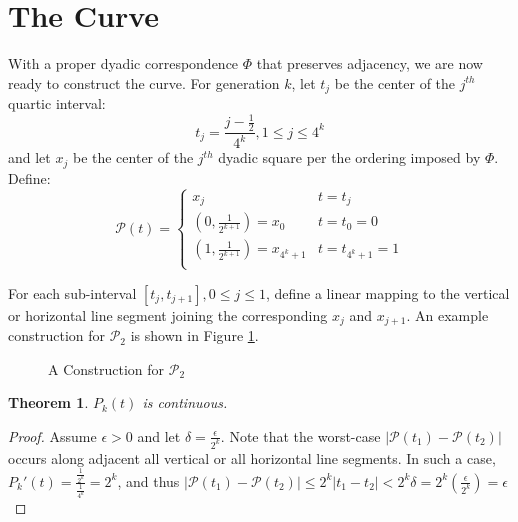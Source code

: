 \documentclass[letterpaper,12pt,fleqn,reqno]{amsart}
\newcommand{\pc}{\mathcal{P}}
\newcommand{\abs}[1]{\left\lvert#1\right\rvert}
\theoremstyle{plain}
\newtheorem{thm}{Theorem}[section]
\begin{document}
\section{The Curve}

With a proper dyadic correspondence $\Phi$ that preserves adjacency, we are now
ready to construct the curve. For generation $k$, let $t_j$ be the center of
the $j^{th}$ quartic interval:
\[t_j=\frac{j-\frac{1}{2}}{4^k}, 1\le j\le4^k\]
and let $x_j$ be the center of the $j^{th}$ dyadic square per the ordering
imposed by $\Phi$. Define:
\[\pc(t)=\begin{cases}
x_j & t=t_j \\
(0,\frac{1}{2^{k+1}})=x_0 & t=t_0=0 \\
(1,\frac{1}{2^{k+1}})=x_{4^k+1} & t=t_{4^k+1}=1 \\
\end{cases}\]

For each sub-interval $[t_j,t_{j+1}],0\le j\le1$, define a linear mapping to
the vertical or horizontal line segment joining the corresponding $x_j$ and
$x_{j+1}$. An example construction for $\pc_2$ is shown in Figure \ref{fig:line}.

\begin{figure}[h]
\caption{A Construction for $\pc_2$}
\label{fig:line}
\end{figure}

\begin{thm}
$P_k(t)$ is continuous.
\end{thm}

\begin{proof}
Assume $\epsilon>0$ and let $\delta=\frac{\epsilon}{2^k}$. Note that the
worst-case $\abs{\pc(t_1)-\pc(t_2)}$ occurs along adjacent all vertical or
all horizontal line segments.  In such a case,
$P_k'(t)=\frac{\frac{1}{2^k}}{\frac{1}{4^k}}=2^k$, and thus
$\abs{\pc(t_1)-\pc(t_2)}\le2^k\abs{t_1-t_2}<2^k\delta=
    2^k\left(\frac{\epsilon}{2^k}\right)=\epsilon$
\end{proof}
\end{document}
